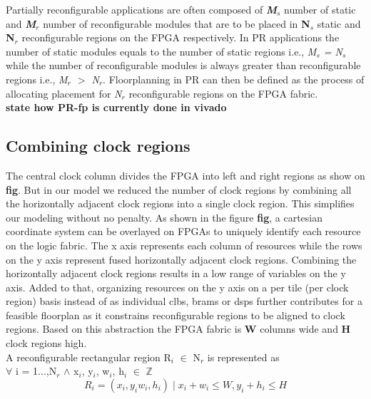 Partially reconfigurable applications are often composed of \textbf{\textit{M$_s$}} number of static and \textbf{\textit{M$_r$}} number of reconfigurable modules that are to be placed in \textbf{N$_s$} static and \textbf{N$_r$} reconfigurable regions on the FPGA respectively.  In PR applications the number of static modules equals to the number of static regions i.e., \textit{M$_s$ = N$_s$} while the number of reconfigurable modules is always greater than reconfigurable regions i.e., \textit{M$_r$ $>$ N$_r$}. Floorplanning in PR can then be defined as the process of allocating placement for \textit{N$_r$} reconfigurable regions on the FPGA fabric. \\

\textbf{state how PR-fp is currently done in vivado} \\

\subsection{Combining clock regions}
The central clock column divides the FPGA into left and right regions as show on \textbf{fig}. But in our model we reduced the number of clock regions by combining all the horizontally adjacent clock regions into a single clock region. This simplifies our modeling without no penalty. As shown in the figure \textbf{fig}, a cartesian coordinate system can be overlayed on FPGAs to uniquely identify each resource on the logic fabric. The x axis represents each column of resources while the rows on the y axis represent fused horizontally adjacent clock regions. Combining the horizontally adjacent clock regions results in a low range of variables on the y axis. Added to that, organizing resources on the y axis on a per tile (per clock region) basis instead of as individual clbs, brams or dsps further contributes for a feasible floorplan as it constrains reconfigurable regions to be aligned to clock regions. Based on this abstraction the FPGA fabric is \textbf{W} columns wide and \textbf{H} clock regions high.  \\

A reconfigurable rectangular region R$_i$ $\in$ N$_r$ is represented as \\

$\forall$ i = 1...,N$_r$ $\wedge$  x$_i$, y$_i$, w$_i$, h$_i$ $\in$ $\mathbb{Z}$
\begin{equation}
R_i = (x_i, y_i w_i, h_i) \mid x_i + w_i \leq W, y_i + h_i \leq H
\end{equation}

